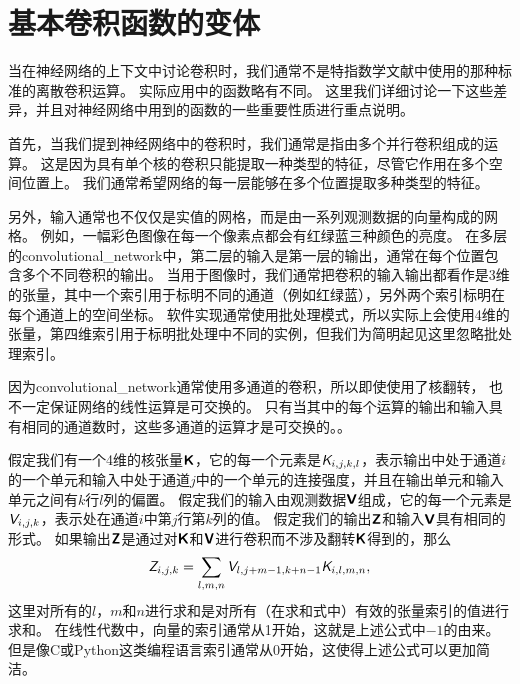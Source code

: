 
\section{基本卷积函数的变体}
\label{sec:variants_of_the_basic_convolution_function}

当在神经网络的上下文中讨论卷积时，我们通常不是特指数学文献中使用的那种标准的离散卷积运算。
实际应用中的函数略有不同。
这里我们详细讨论一下这些差异，并且对神经网络中用到的函数的一些重要性质进行重点说明。

首先，当我们提到神经网络中的卷积时，我们通常是指由多个并行卷积组成的运算。
这是因为具有单个核的卷积只能提取一种类型的特征，尽管它作用在多个空间位置上。
我们通常希望网络的每一层能够在多个位置提取多种类型的特征。

另外，输入通常也不仅仅是实值的网格，而是由一系列观测数据的向量构成的网格。
例如，一幅彩色图像在每一个像素点都会有红绿蓝三种颜色的亮度。
在多层的\gls{convolutional_network}中，第二层的输入是第一层的输出，通常在每个位置包含多个不同卷积的输出。
当用于图像时，我们通常把卷积的输入输出都看作是3维的张量，其中一个索引用于标明不同的通道（例如红绿蓝），另外两个索引标明在每个通道上的空间坐标。
软件实现通常使用批处理模式，所以实际上会使用4维的张量，第四维索引用于标明批处理中不同的实例，但我们为简明起见这里忽略批处理索引。

因为\gls{convolutional_network}通常使用多通道的卷积，所以即使使用了核翻转， 也不一定保证网络的线性运算是可交换的。
只有当其中的每个运算的输出和输入具有相同的通道数时，这些多通道的运算才是可交换的。。

假定我们有一个4维的核张量$\textsf{\textbf{K}}$，它的每一个元素是$\textit{\textsf{K}}_{i,j,k,l}$，表示输出中处于通道$i$的一个单元和输入中处于通道$j$中的一个单元的连接强度，并且在输出单元和输入单元之间有$k$行$l$列的偏置。
假定我们的输入由观测数据$\textsf{\textbf{V}}$组成，它的每一个元素是$\textit{\textsf{V}}_{i,j,k}$，表示处在通道$i$中第$j$行第$k$列的值。
假定我们的输出$\textsf{\textbf{Z}}$和输入$\textsf{\textbf{V}}$具有相同的形式。
如果输出$\textsf{\textbf{Z}}$是通过对$\textsf{\textbf{K}}$和$\textsf{\textbf{V}}$进行卷积而不涉及翻转$\textsf{\textbf{K}}$得到的，那么
\begin{equation}
\textit{\textsf{Z}}_{i,j,k} = \sum_{l,m,n} \textit{\textsf{V}}_{l, j+m-1, k+n-1} \textit{\textsf{K}}_{i,l,m,n},
\end{equation}
这里对所有的$l$，$m$和$n$进行求和是对所有（在求和式中）有效的张量索引的值进行求和。
在线性代数中，向量的索引通常从1开始，这就是上述公式中$-1$的由来。
但是像C或Python这类编程语言索引通常从0开始，这使得上述公式可以更加简洁。

 
